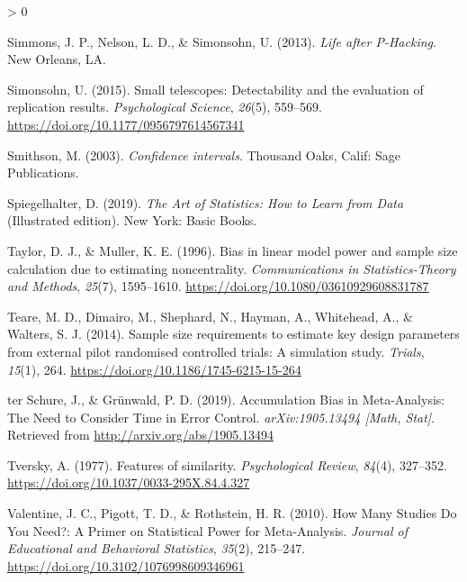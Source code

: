 \documentclass[
  english,
  ,jou,floatsintext]{apa6}
\newlength{\cslhangindent}
\newenvironment{CSLReferences}[2] %
 {%
  \setlength{\parindent}{0pt}
  \ifodd #1 \everypar{\setlength{\hangindent}{\cslhangindent}}\ignorespaces\fi
  \ifnum #2 > 0
  \setlength{\parskip}{#2\baselineskip}
  \fi
 }%
 {}
\begin{document}
\begin{CSLReferences}{1}{0}
\leavevmode\hypertarget{ref-simmons_life_2013}{}%
Simmons, J. P., Nelson, L. D., \& Simonsohn, U. (2013). \emph{Life after {P-Hacking}}. {New Orleans, LA}.

\leavevmode\hypertarget{ref-simonsohn_small_2015}{}%
Simonsohn, U. (2015). Small telescopes: {Detectability} and the evaluation of replication results. \emph{Psychological Science}, \emph{26}(5), 559--569. \url{https://doi.org/10.1177/0956797614567341}

\leavevmode\hypertarget{ref-smithson_confidence_2003}{}%
Smithson, M. (2003). \emph{Confidence intervals}. {Thousand Oaks, Calif}: {Sage Publications}.

\leavevmode\hypertarget{ref-spiegelhalter_art_2019}{}%
Spiegelhalter, D. (2019). \emph{The {Art} of {Statistics}: {How} to {Learn} from {Data}} (Illustrated edition). {New York}: {Basic Books}.

\leavevmode\hypertarget{ref-taylor_bias_1996}{}%
Taylor, D. J., \& Muller, K. E. (1996). Bias in linear model power and sample size calculation due to estimating noncentrality. \emph{Communications in Statistics-Theory and Methods}, \emph{25}(7), 1595--1610. \url{https://doi.org/10.1080/03610929608831787}

\leavevmode\hypertarget{ref-teare_sample_2014}{}%
Teare, M. D., Dimairo, M., Shephard, N., Hayman, A., Whitehead, A., \& Walters, S. J. (2014). Sample size requirements to estimate key design parameters from external pilot randomised controlled trials: A simulation study. \emph{Trials}, \emph{15}(1), 264. \url{https://doi.org/10.1186/1745-6215-15-264}

\leavevmode\hypertarget{ref-ter_schure_accumulation_2019}{}%
ter Schure, J., \& Grünwald, P. D. (2019). Accumulation {Bias} in {Meta-Analysis}: {The Need} to {Consider Time} in {Error Control}. \emph{arXiv:1905.13494 {[}Math, Stat{]}}. Retrieved from \url{http://arxiv.org/abs/1905.13494}

\leavevmode\hypertarget{ref-tversky_features_1977}{}%
Tversky, A. (1977). Features of similarity. \emph{Psychological Review}, \emph{84}(4), 327--352. \url{https://doi.org/10.1037/0033-295X.84.4.327}

\leavevmode\hypertarget{ref-valentine_how_2010}{}%
Valentine, J. C., Pigott, T. D., \& Rothstein, H. R. (2010). How {Many Studies Do You Need}?: {A Primer} on {Statistical Power} for {Meta-Analysis}. \emph{Journal of Educational and Behavioral Statistics}, \emph{35}(2), 215--247. \url{https://doi.org/10.3102/1076998609346961}


\end{CSLReferences}
\end{document}
